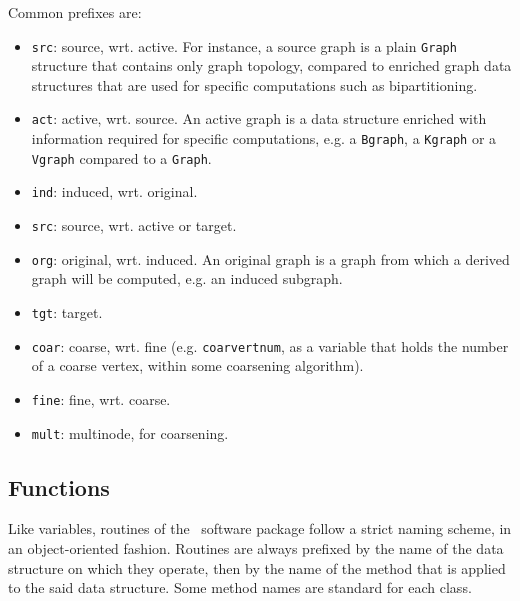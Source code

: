 Common prefixes are:
\begin{itemize}
\item
\texttt{src}: source, wrt. active. For instance, a source graph is a
plain \texttt{Graph} structure that contains only graph topology,
compared to enriched graph data structures that are used for specific
computations such as bipartitioning.
\item
\texttt{act}: active, wrt. source. An active graph is a data structure
enriched with information required for specific computations, e.g. a
\texttt{Bgraph}, a \texttt{Kgraph} or a \texttt{Vgraph} compared to a
\texttt{Graph}.
\item
\texttt{ind}: induced, wrt. original.
\item
\texttt{src}: source, wrt. active or target.
\item
\texttt{org}: original, wrt. induced. An original graph is a graph
from which a derived graph will be computed, e.g. an induced subgraph.
\item
\texttt{tgt}: target.
\item
\texttt{coar}: coarse, wrt. fine (e.g. \texttt{coarvertnum}, as a
variable that holds the number of a coarse vertex, within some
coarsening algorithm).
\item
\texttt{fine}: fine, wrt. coarse.
\item
\texttt{mult}: multinode, for coarsening.
\end{itemize}

\subsection{Functions}
\label{sec-naming-functions}

Like variables, routines of the \scotch\ software package follow a
strict naming scheme, in an object-oriented fashion. Routines are
always prefixed by the name of the data structure on which they
operate, then by the name of the method that is applied to the said
data structure. Some method names are standard for each class.

